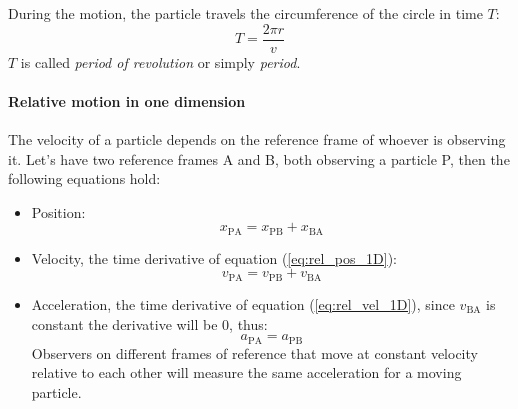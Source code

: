 \documentclass{scrartcl}
\begin{document}
    During the motion, the particle travels the circumference of the circle in time $T$:
    \begin{equation}
        T = \frac{2\pi r}{v}
    \end{equation}
    $T$ is called \emph{period of revolution} or simply \emph{period}.
    
    \paragraph{Relative motion in one dimension} The velocity of a particle depends on the reference frame of whoever is observing it. Let's have two reference frames A and B, both observing a particle P, then the following equations hold:
    \begin{itemize}
        \item Position:
        \begin{equation} \label{eq:rel_pos_1D}
            x_{\mathrm{PA}} = x_{\mathrm{PB}} + x_{\mathrm{BA}}
        \end{equation}
        \item Velocity, the time derivative of equation (\ref{eq:rel_pos_1D}):
        \begin{equation} \label{eq:rel_vel_1D}
            v_{\mathrm{PA}} = v_{\mathrm{PB}} + v_{\mathrm{BA}}
        \end{equation}
        \item Acceleration, the time derivative of equation (\ref{eq:rel_vel_1D}), since $v_{\mathrm{BA}}$ is constant the derivative will be $0$, thus:
        \begin{equation}
            a_{\mathrm{PA}} = a_{\mathrm{PB}}
        \end{equation}
        Observers on different frames of reference that move at constant velocity relative to each other will measure the same acceleration for a moving particle.
    \end{itemize}
\end{document}
